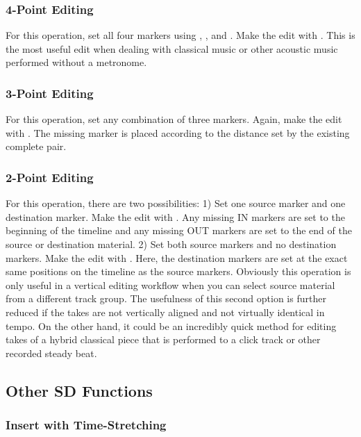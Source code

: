 \documentclass[10pt,american]{article}
\begin{document}
\subsubsection{4-Point Editing}

For this operation, set all four markers using  ,  , 
and  . Make the edit with  . This is the most useful edit when
dealing with classical music or other acoustic music performed without a
metronome.

\subsubsection{3-Point Editing}

For this operation, set any combination of three markers. Again, make the edit
with  . The missing marker is placed according to the distance set by
the existing complete pair. 

\subsubsection{2-Point Editing}

For this operation, there are two possibilities: 1) Set one source marker and
one destination marker. Make the edit with  . Any missing IN markers are
set to the beginning of the timeline and any missing OUT markers are set to the
end of the source or destination material. 2) Set both source markers and no
destination markers. Make the edit with  . Here, the destination markers
are set at the exact same positions on the timeline as the source markers.
Obviously this operation is only useful in a vertical editing workflow when you
can select source material from a different track group. The usefulness of this
second option is further reduced if the takes are not vertically aligned and not
virtually identical in tempo. On the other hand, it could be an incredibly quick
method for editing takes of a hybrid classical piece that is performed to a
click track or other recorded steady beat.

\subsection{Other SD Functions}

\subsubsection{Insert with Time-Stretching}
\end{document}
